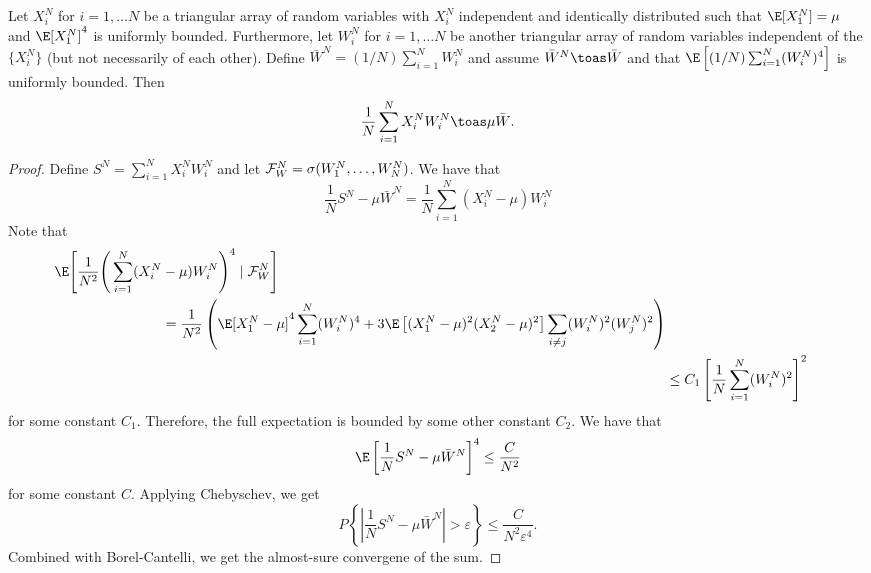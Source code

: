 \begin{lemma}\label{L:strong-weighted}
    Let $X_i^N$ for $i = 1, \ldots N$ be a triangular array of random variables
    with $X_i^N$ independent and identically distributed such that
    $\E[ X_1^N ] = \mu$ and $\E [ X_1^N ]^4$ is uniformly bounded.  
    Furthermore, let $W_i^N$ for $i = 1, \ldots N$ be another triangular array
    of random variables independent of the $\{ X_i^N \}$ (but not necessarily
    of each other).  Define $\bar W^N = (1/N) \sum_{i=1}^N W_i^N$ and assume
    $\bar W^N \toas \bar W$ and that
    $\E \left[ (1/N) \sum_{i=1}^N (W_i^N)^4 \right]$ is uniformly bounded.
    Then
    \[
        \frac{1}{N} \sum_{i=1}^N X_i^N W_i^N \toas \mu \bar W.
    \]
\end{lemma}
\begin{proof}
    Define $S^N = \sum_{i=1}^N X_i^N W_i^N$ and let
    $\mathcal{F}^N_W = \sigma( W_1^N, \ldots, W_N^N)$.  We have that
    \[
        \frac{1}{N} S^N - \mu \bar W^N
        = 
       \frac{1}{N}
       \sum_{i=1}^N
           (X_i^N - \mu) W_i^N
    \]
    Note that
    \begin{align*}
        \begin{split}
        \E \Bigg[
            \frac{1}{N^2}
            \Bigg(
                \sum_{i=1}^N
                    (X_i^N &-{} \mu) W_i^N
            \Bigg)^4
        \mid
            \F_W^N
        \Bigg] \\
        &= \frac{1}{N^2} \left(
               \E [ X_1^N - \mu]^4
               \sum_{i=1}^N
                   (W_i^N)^4
               +
               3 \E \left[
                   (X_1^N - \mu)^2 (X_2^N - \mu)^2
               \right]
               \sum_{i \neq j}
                   (W_i^N)^2 (W_j^N)^2
           \right)
        \end{split} \\
        &\leq C_1 \left[
            \frac{1}{N}
            \sum_{i=1}^N (W_i^N)^2
        \right]^2
    \end{align*}
    for some constant $C_1$.  Therefore, the full expectation is bounded by
    some other constant $C_2$.  We have that
    \[
        \E \left[ 
            \frac{1}{N} S^N - \mu \bar W^N
           \right]^4
        \leq \frac{C}{N^2}
    \]
    for some constant $C$.  Applying Chebyschev, we get
    \[
        P \left\{
            \left|
                \frac{1}{N} S^N - \mu \bar W^N
            \right|
            > \varepsilon
        \right\}
        \leq \frac{C}{N^2 \varepsilon^4}.
    \]
    Combined with Borel-Cantelli, we get the almost-sure convergene of the
    sum.
\end{proof}

